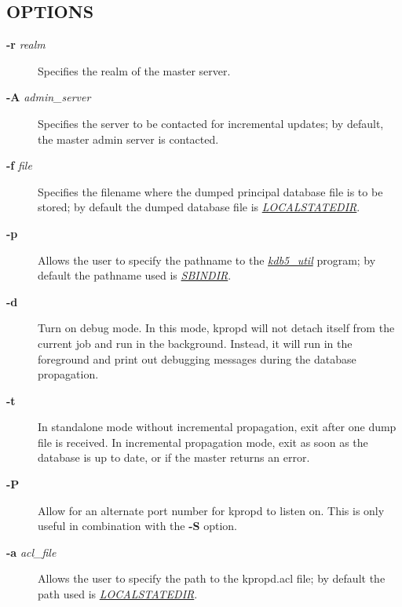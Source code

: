 \documentclass[letterpaper,10pt,english]{sphinxmanual}
\begin{document}
\subsection{OPTIONS}
\label{admin/admin_commands/kpropd:options}\begin{description}
\item[{\textbf{-r} \emph{realm}}] \leavevmode
Specifies the realm of the master server.

\item[{\textbf{-A} \emph{admin\_server}}] \leavevmode
Specifies the server to be contacted for incremental updates; by
default, the master admin server is contacted.

\item[{\textbf{-f} \emph{file}}] \leavevmode
Specifies the filename where the dumped principal database file is
to be stored; by default the dumped database file is {\hyperref[mitK5defaults:paths]{\emph{LOCALSTATEDIR}}}.

\item[{\textbf{-p}}] \leavevmode
Allows the user to specify the pathname to the {\hyperref[admin/admin_commands/kdb5_util:kdb5-util-8]{\emph{kdb5\_util}}}
program; by default the pathname used is {\hyperref[mitK5defaults:paths]{\emph{SBINDIR}}}.

\item[{\textbf{-d}}] \leavevmode
Turn on debug mode.  In this mode, kpropd will not detach
itself from the current job and run in the background.  Instead,
it will run in the foreground and print out debugging messages
during the database propagation.

\item[{\textbf{-t}}] \leavevmode
In standalone mode without incremental propagation, exit after one
dump file is received.  In incremental propagation mode, exit as
soon as the database is up to date, or if the master returns an
error.

\item[{\textbf{-P}}] \leavevmode
Allow for an alternate port number for kpropd to listen on.  This
is only useful in combination with the \textbf{-S} option.

\item[{\textbf{-a} \emph{acl\_file}}] \leavevmode
Allows the user to specify the path to the kpropd.acl file; by
default the path used is {\hyperref[mitK5defaults:paths]{\emph{LOCALSTATEDIR}}}.

\end{description}
\end{document}
